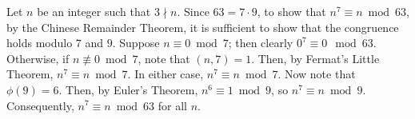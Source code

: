 \documentclass{article}
\begin{document}
\clearpage
\problem{}
Let $n$ be an integer such that $3 \nmid n$. Since $63 = 7 \cdot 9$, to show that $n^7 \equiv n \bmod 63$, by the Chinese Remainder Theorem, it is sufficient to show that the congruence holds modulo $7$ and $9$. Suppose $n \equiv 0 \bmod 7$; then clearly $0^7 \equiv 0 \mod 63$. Otherwise, if $n \not\equiv 0 \bmod 7$, note that $(n, 7) = 1$. Then, by Fermat's Little Theorem, $n^7 \equiv n \bmod 7$. In either case, $n^7 \equiv n \bmod 7$. Now note that $\phi(9) = 6$. Then, by Euler's Theorem, $n^6 \equiv 1 \bmod 9$, so $n^7 \equiv n \bmod 9$. Consequently, $n^7 \equiv n \bmod 63$ for all $n$.
\end{document}
